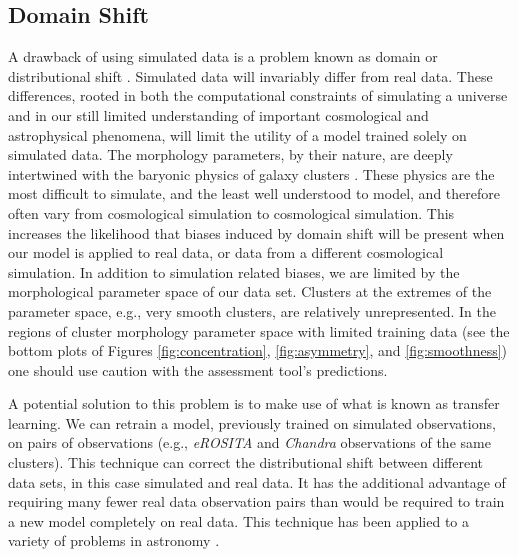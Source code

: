 \documentclass[twocolumn, 11pt]{aastex63}%
\begin{document}
\subsection{Domain Shift}\label{Domain Shift}
A drawback of using simulated data is a problem known as domain or distributional shift \citep[see section 7 of ][for a discussion]{Amodei_2016}. Simulated data will invariably differ from real data. These differences, rooted in both the computational constraints of simulating a universe and in our still limited understanding of important cosmological and astrophysical phenomena, will limit the utility of a model trained solely on simulated data. The morphology parameters, by their nature, are deeply intertwined with the baryonic physics of galaxy clusters \citep[e.g.,][]{Lau_2011, Lau_2012, Chen_2019, Fernando_2021}. These physics are the most difficult to simulate, and the least well understood to model, and therefore often vary from cosmological simulation to cosmological simulation. This increases the likelihood that biases induced by domain shift will be present when our model is applied to real data, or data from a different cosmological simulation. In addition to simulation related biases, we are limited by the morphological parameter space of our data set. Clusters at the extremes of the parameter space, e.g., very smooth clusters, are relatively unrepresented. In the regions of cluster morphology parameter space with limited training data (see the bottom plots of Figures \ref{fig:concentration}, \ref{fig:asymmetry}, and \ref{fig:smoothness}) one should use caution with the assessment tool's predictions. 

A potential solution to this problem is to make use of what is known as transfer learning. We can retrain a model, previously trained on simulated observations, on pairs of observations (e.g., \textit{eROSITA} and \textit{Chandra} observations of the same clusters). This technique can correct the distributional shift between different data sets, in this case simulated and real data. It has the additional advantage of requiring many fewer real data observation pairs than would be required to train a new model completely on real data. This technique has been applied to a variety of problems in astronomy \citep[e.g.,][]{Ackermann_2018, Dominguez_2019, Perez_Carrasco_2019}.
\end{document}
